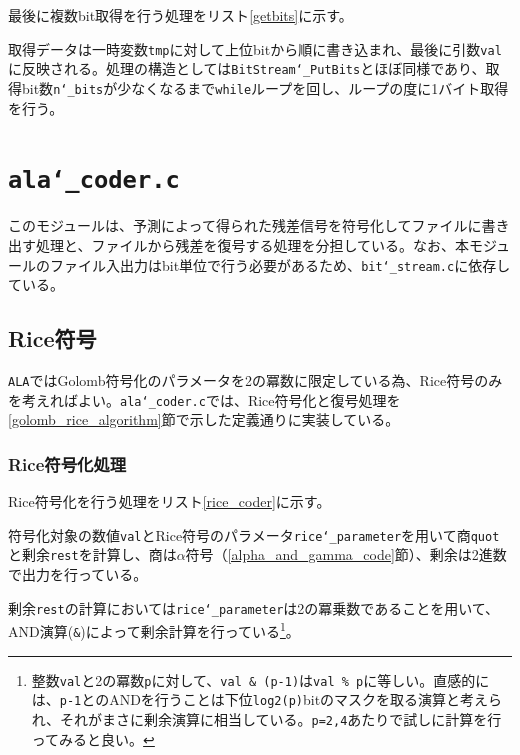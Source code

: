 \documentclass[uplatex,dvipdfmx,b5j,10pt]{jsbook}
\theoremstyle{definition}
\begin{document}
最後に複数bit取得を行う処理をリスト\ref{getbits}に示す。


取得データは一時変数\texttt{tmp}に対して上位bitから順に書き込まれ、最後に引数\texttt{val}に反映される。処理の構造としては\texttt{BitStream\char`_PutBits}とほぼ同様であり、取得bit数\texttt{n\char`_bits}が少なくなるまで\texttt{while}ループを回し、ループの度に1バイト取得を行う。

\section{\texttt{ala\char`_coder.c}}

このモジュールは、予測によって得られた残差信号を符号化してファイルに書き出す処理と、ファイルから残差を復号する処理を分担している。なお、本モジュールのファイル入出力はbit単位で行う必要があるため、\texttt{bit\char`_stream.c}に依存している。

\subsection{Rice符号}

\texttt{ALA}ではGolomb符号化のパラメータを2の冪数に限定している為、Rice符号のみを考えればよい。\texttt{ala\char`_coder.c}では、Rice符号化と復号処理を\ref{golomb_rice_algorithm}節で示した定義通りに実装している。

\subsubsection{Rice符号化処理}
Rice符号化を行う処理をリスト\ref{rice_coder}に示す。


符号化対象の数値\texttt{val}とRice符号のパラメータ\texttt{rice\char`_parameter}を用いて商\texttt{quot}と剰余\texttt{rest}を計算し、商は$\alpha$符号（\ref{alpha_and_gamma_code}節）、剰余は2進数で出力を行っている。

剰余\texttt{rest}の計算においては\texttt{rice\char`_parameter}は2の冪乗数であることを用いて、AND演算(\texttt{\&})によって剰余計算を行っている\footnote{整数\texttt{val}と2の冪数\texttt{p}に対して、\texttt{val \& (p-1)}は\texttt{val \% p}に等しい。直感的には、\texttt{p-1}とのANDを行うことは下位\texttt{log2(p)}bitのマスクを取る演算と考えられ、それがまさに剰余演算に相当している。\texttt{p=2,4}あたりで試しに計算を行ってみると良い。}。
\end{document}
